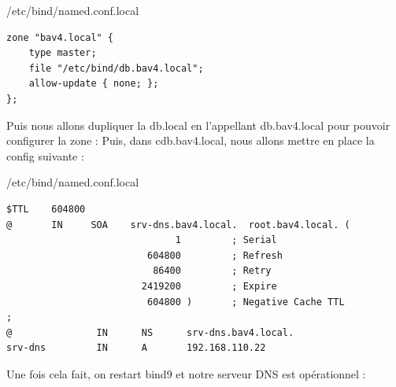 \documentclass{article}
\begin{document}
\begin{configbox}{/etc/bind/named.conf.local}
\begin{lstlisting}
zone "bav4.local" {
    type master;
    file "/etc/bind/db.bav4.local";
    allow-update { none; };
};
\end{lstlisting}
\end{configbox}
Puis nous allons dupliquer la db.local en l’appellant db.bav4.local pour pouvoir configurer la zone : 
Puis, dans cdb.bav4.local, nous allons mettre en place la config suivante :

\begin{configbox}{/etc/bind/named.conf.local}
\begin{lstlisting}
$TTL    604800
@       IN     SOA    srv-dns.bav4.local.  root.bav4.local. (
                              1         ; Serial
                         604800         ; Refresh
                          86400         ; Retry
                        2419200         ; Expire
                         604800 )       ; Negative Cache TTL
;
@               IN      NS      srv-dns.bav4.local.
srv-dns         IN      A       192.168.110.22
\end{lstlisting}
\end{configbox}
Une fois cela fait, on restart bind9 et notre serveur DNS est opérationnel :
\end{document}

